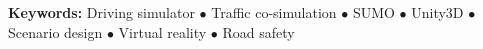 \documentclass[12pt,a4paper,oneside]{report}
\begin{document}
\vspace{0.8cm}
\begin{infobox}
\textbf{\color{PrimaryNavy}Keywords:} Driving simulator $\bullet$ Traffic co-simulation $\bullet$ SUMO $\bullet$ Unity3D $\bullet$ Scenario design $\bullet$ Virtual reality $\bullet$ Road safety
\end{infobox}

\newpage
{}
\setcounter{page}{1}
\tableofcontents

\newpage
\listoftables

\newpage
{}
\setcounter{page}{1}











\newpage
{}
\end{document}
